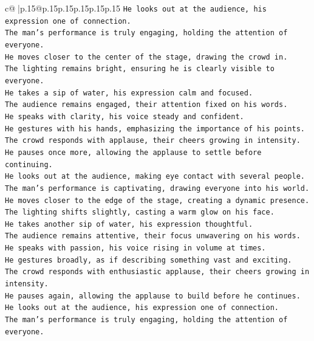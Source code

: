 \documentclass{article}
\begin{document}
{\begin{supertabular}{c@{$\;$}|p{.15\linewidth}@{}p{.15\linewidth}p{.15\linewidth}p{.15\linewidth}p{.15\linewidth}p{.15\linewidth}}
{{{\texttt{He looks out at the audience, his expression one of connection.  } \\
\texttt{The man's performance is truly engaging, holding the attention of everyone.  } \\
\texttt{He moves closer to the center of the stage, drawing the crowd in.  } \\
\texttt{The lighting remains bright, ensuring he is clearly visible to everyone.  } \\
\texttt{He takes a sip of water, his expression calm and focused.  } \\
\texttt{The audience remains engaged, their attention fixed on his words.  } \\
\texttt{He speaks with clarity, his voice steady and confident.  } \\
\texttt{He gestures with his hands, emphasizing the importance of his points.  } \\
\texttt{The crowd responds with applause, their cheers growing in intensity.  } \\
\texttt{He pauses once more, allowing the applause to settle before continuing.  } \\
\texttt{He looks out at the audience, making eye contact with several people.  } \\
\texttt{The man's performance is captivating, drawing everyone into his world.  } \\
\texttt{He moves closer to the edge of the stage, creating a dynamic presence.  } \\
\texttt{The lighting shifts slightly, casting a warm glow on his face.  } \\
\texttt{He takes another sip of water, his expression thoughtful.  } \\
\texttt{The audience remains attentive, their focus unwavering on his words.  } \\
\texttt{He speaks with passion, his voice rising in volume at times.  } \\
\texttt{He gestures broadly, as if describing something vast and exciting.  } \\
\texttt{The crowd responds with enthusiastic applause, their cheers growing in intensity.  } \\
\texttt{He pauses again, allowing the applause to build before he continues.  } \\
\texttt{He looks out at the audience, his expression one of connection.  } \\
\texttt{The man's performance is truly engaging, holding the attention of everyone.  } \\
}}}
\end{supertabular}}
\end{document}
